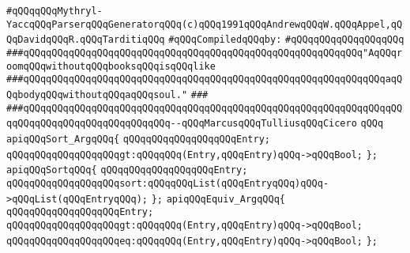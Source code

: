 \label{src/app/yacc/src/shrink.pkg}
\verb|#qQQqqQQqMythryl-YaccqQQqParserqQQqGeneratorqQQq(c)qQQq1991qQQqAndrewqQQqW.qQQqAppel,qQQqDavidqQQqR.qQQqTarditiqQQq|\newline
\newline
\verb|#qQQqCompiledqQQqby:|\newline
\verb|#qQQqqQQqqQQqqQQqqQQq|\newline
\newline
\verb|###qQQqqQQqqQQqqQQqqQQqqQQqqQQqqQQqqQQqqQQqqQQqqQQqqQQqqQQqqQQq"AqQQqroomqQQqwithoutqQQqbooksqQQqisqQQqlike|\newline
\verb|###qQQqqQQqqQQqqQQqqQQqqQQqqQQqqQQqqQQqqQQqqQQqqQQqqQQqqQQqqQQqqQQqaqQQqbodyqQQqwithoutqQQqaqQQqsoul."|\newline
\verb|###|\newline
\verb|###qQQqqQQqqQQqqQQqqQQqqQQqqQQqqQQqqQQqqQQqqQQqqQQqqQQqqQQqqQQqqQQqqQQqqQQqqQQqqQQqqQQqqQQqqQQqqQQq--qQQqMarcusqQQqTulliusqQQqCicero|\newline
\newline
\newline
\verb|qQQq|\newline
\verb|apiqQQqSort_ArgqQQq{|\newline
\newline
\verb|qQQqqQQqqQQqqQQqqQQqEntry;|\newline
\verb|qQQqqQQqqQQqqQQqqQQqgt:qQQqqQQq(Entry,qQQqEntry)qQQq->qQQqBool;|\newline
\verb|};|\newline
\newline
\verb|apiqQQqSortqQQq{|\newline
\newline
\verb|qQQqqQQqqQQqqQQqqQQqEntry;|\newline
\verb|qQQqqQQqqQQqqQQqqQQqsort:qQQqqQQqList(qQQqEntryqQQq)qQQq->qQQqList(qQQqEntryqQQq);|\newline
\verb|};|\newline
\newline
\verb|apiqQQqEquiv_ArgqQQq{|\newline
\newline
\verb|qQQqqQQqqQQqqQQqqQQqEntry;|\newline
\verb|qQQqqQQqqQQqqQQqqQQqgt:qQQqqQQq(Entry,qQQqEntry)qQQq->qQQqBool;|\newline
\verb|qQQqqQQqqQQqqQQqqQQqeq:qQQqqQQq(Entry,qQQqEntry)qQQq->qQQqBool;|\newline
\verb|};|\newline
